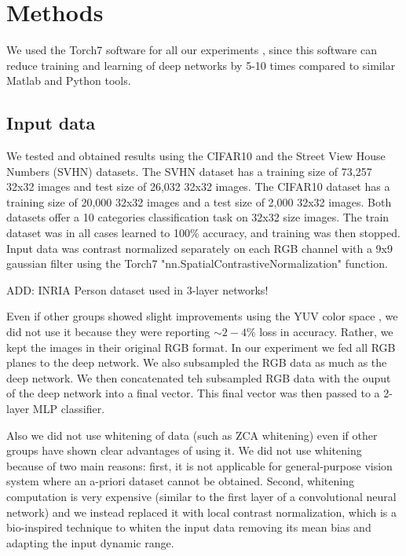 \documentclass{article} %
\begin{document}
\section{Methods}
\label{sec-methods}


We used the Torch7 software for all our experiments \cite{collobert_torch7_2011}, since this software can reduce training and learning of deep networks by 5-10 times compared to similar Matlab and Python tools.


\subsection{Input data}

We tested and obtained results using the CIFAR10 \cite{krizhevsky_learning_2009} and the Street View House Numbers (SVHN) \cite{netzer_reading_2011} datasets. The SVHN dataset has a training size of 73,257 32x32 images and test size of 26,032 32x32 images. The CIFAR10 dataset has a training size of 20,000 32x32 images and a test size of 2,000 32x32 images. Both datasets offer a 10 categories classification task on 32x32 size images. The train dataset was in all cases learned to 100\% accuracy, and training was then stopped. Input data was contrast normalized separately on each RGB channel with a 9x9 gaussian filter using the Torch7 "nn.SpatialContrastiveNormalization" function.

ADD: INRIA Person dataset used in 3-layer networks!

Even if other groups showed slight improvements using the YUV color space \cite{jarrett_what_2009}, we did not use it because they were reporting $\sim 2-4\%$ loss in accuracy. Rather, we kept the images in their original RGB format. In our experiment we fed all RGB planes to the deep network. We also subsampled the RGB data as much as the deep network. We then concatenated teh subsampled RGB data with the ouput of the deep network into a final vector. This final vector was then passed to a 2-layer MLP classifier.

Also we did not use whitening of data (such as ZCA whitening) even if other groups have shown clear advantages of using it.  We did not use whitening because of two main reasons: first, it is not applicable for general-purpose vision system where an a-priori dataset cannot be obtained. Second, whitening computation is very expensive (similar to the first layer of a convolutional neural network) and we instead replaced it with local contrast normalization, which is a bio-inspired technique to whiten the input data removing its mean bias and adapting the input dynamic range.
\end{document}

